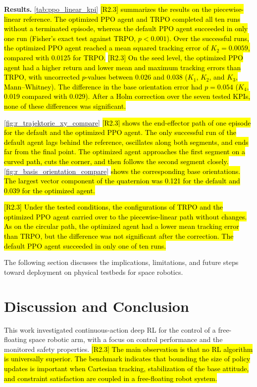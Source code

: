 \documentclass{ieeeaccess}
\newcommand{\hlone}[1]{{\sethlcolor{rone}\hl{#1}}}
\begin{document}
\textbf{Results.} \cref{tab:ppo_linear_kpi} \hlone{[R2.3] summarizes the results on the piecewise-linear reference. The
optimized PPO agent and TRPO completed all ten runs without a terminated episode, whereas the default PPO
agent succeeded in only one run (Fisher's exact test against TRPO, $p < 0.001$). Over the successful runs,
the optimized PPO agent reached a mean squared tracking error of $K_2 = 0.0059$, compared with 0.0125 for
TRPO.} \hlone{[R2.3] On the seed level, the optimized PPO agent had a higher return and lower mean and
maximum tracking errors than TRPO, with uncorrected $p$-values between 0.026 and 0.038 ($K_1$, $K_2$, and
$K_3$, Mann--Whitney). The difference in the base orientation error had $p = 0.054$ ($K_4$, 0.019
compared with 0.029). After a Holm correction over the seven tested KPIs, none of these differences was
significant.}

\cref{fig:r_trajektorie_xy_compare} \hlone{[R2.3] shows the end-effector path of one episode for the default and the
optimized PPO agent. The only successful run of the default agent lags behind the reference, oscillates
along both segments, and ends far from the final point. The optimized agent approaches the first segment on
a curved path, cuts the corner, and then follows the second segment closely.}
\cref{fig:r_basis_orientation_compare} \hlone{shows the corresponding base orientations. The largest vector
component of the quaternion was 0.121 for the default and 0.039 for the optimized agent.}

\hlone{[R2.3] Under the tested conditions, the configurations of TRPO and the optimized PPO
agent carried over to the piecewise-linear path without changes. As on the circular path, the optimized
agent had a lower mean tracking error than TRPO, but the difference was not significant after the
correction. The default PPO agent succeeded in only one of ten runs.}

The following section discusses the implications, limitations, and future steps toward deployment on physical
testbeds for space robotics.

\section{Discussion and Conclusion}\label{sec:discussion} This work investigated continuous-action deep
RL for the control of a free-floating space robotic arm, with a focus on control performance and the
monitored safety properties. \hlone{[R2.3] The main observation is that no RL algorithm is universally
superior. The benchmark indicates that bounding the size of policy updates is important when Cartesian
tracking, stabilization of the base attitude, and constraint satisfaction are coupled in a free-floating
robot system.}
\end{document}
